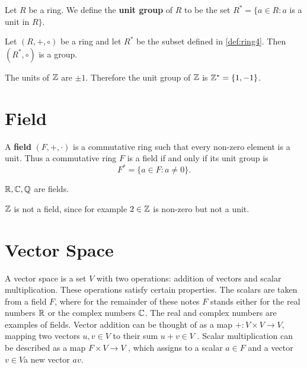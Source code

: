 \documentclass[12pt]{book}
\begin{document}
\begin{defi}\label{def:ring4}
      Let $R$ be a ring. We define the \textbf{unit group} of $R$ to be the set
	  $R^* = \{a \in R : a$ is  a unit in $R \}.$
\end{defi}
\begin{lem}\label{lem::ring5}
      Let $(R,+, \circ)$ be a ring and let $R^*$ be the subset defined in \ref{def:ring4}. Then $(R^*, \circ)$ is a group.
\end{lem}

\begin{examp}\label{exp:ring6}
      The units of $\mathbb{Z}$ are $\pm 1$. Therefore the unit group of $\mathbb{Z}$ is $\mathbb{Z} ^* = \{1,-1 \}$.  
\end{examp}
\section{Field}
\label{sec:Field}

\begin{defi}\label{def:field}
      A \textbf{field} $(F,+,\cdot)$ is a commutative ring such that every non-zero element is a unit. Thus a commutative ring $F$ is a field 
	  if and only if its unit group is
	  $$F^*= \{a \in F : a \not = 0 \}.$$
\end{defi}
\begin{examp}\label{exp:field1}
      $\mathbb{R}, \mathbb{C}, \mathbb{Q}$ are fields.
\end{examp} 
\begin{examp}\label{exp:field2}
      $\mathbb{Z}$ is not a field, since for example $2 \in \mathbb{Z}$ is non-zero but not a unit.
\end{examp}

\section{Vector Space}
\label{sec:Vector Space}

A vector space is a set $V$ with two operations: addition of vectors and scalar multiplication. These operations satisfy certain properties. 
The scalars are taken from a field $F$, where for the remainder of these notes $F$ stands either for the real numbers $\mathbb{R}$ or the complex 
numbers $\mathbb{C}$. The real and complex numbers are examples of fields. Vector addition can be thought of as a map $+ : V \times V \rightarrow V $, 
mapping two vectors $u, v \in V$ to their sum $u+ v \in V$ . Scalar multiplication can be described as a map $F \times V \rightarrow V$ , which 
assigns to a scalar $a \in F$ and a vector $v \in V $a new vector $av$.
\end{document}
